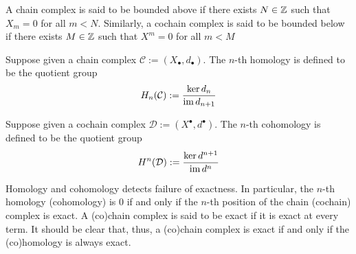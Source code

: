 \medskip

\begin{defn} [Boundedness]
    A chain complex is said to be bounded above if there exists $N\in {\mathbb Z}$ such that $X_m=0$ for all $m<N$. Similarly, a cochain complex is said to be bounded below if there exists $M\in {\mathbb Z}$ such that $X^m=0$ for all $m<M$
\end{defn}

\medskip

\begin{defn} [Homology]
    Suppose given a chain complex $\mathcal C:=(X_\bullet, d_\bullet)$. The $n$-th homology is defined to be the quotient group
    \[H_n(\mathcal C):= \frac{\ker d_n}{\operatorname{im} d_{n+1}}\]
\end{defn}

\begin{defn} [Cohomology]
    Suppose given a cochain complex $\mathcal D:=(X^\bullet, d^\bullet)$. The $n$-th cohomology is defined to be the quotient group
    \[H^n(\mathcal D):= \frac{\ker d^{n+1}}{\operatorname{im} d^{n}}\]
\end{defn}

\begin{re} 
    Homology and cohomology detects failure of exactness. In particular, the $n$-th homology (cohomology) is $0$ if and only if the $n$-th position of the chain (cochain) complex is exact. A (co)chain complex is said to be exact if it is exact at every term. It should be clear that, thus, a (co)chain complex is exact if and only if the (co)homology is always exact.
\end{re}
